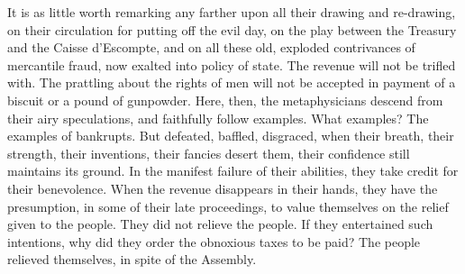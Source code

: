 It is as little worth remarking any farther upon all their drawing and re-drawing, on their circulation for putting off the evil day, on the play between the Treasury and the Caisse d'Escompte, and on all these old, exploded contrivances of mercantile fraud, now exalted into policy of state. The revenue will not be trifled with. The prattling about the rights of men will not be accepted in payment of a biscuit or a pound of gunpowder. Here, then, the metaphysicians descend from their airy speculations, and faithfully follow examples. What examples? The examples of bankrupts. But defeated, baffled, disgraced, when their breath, their strength, their inventions, their fancies desert them, their confidence still maintains its ground. In the manifest failure of their abilities, they take credit for their benevolence. When the revenue disappears in their hands, they have the presumption, in some of their late proceedings, to value themselves on the relief given to the people. They did not relieve the people. If they entertained such intentions, why did they order the obnoxious taxes to be paid? The people relieved themselves, in spite of the Assembly.


